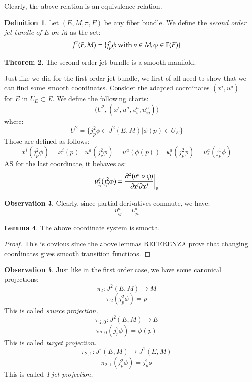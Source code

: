 \documentclass[12pt,a4paper]{report}
\theoremstyle{definition}
\newtheorem{Def}{Definition}[chapter]
\theoremstyle{Theorem}
\newtheorem{Theo}[Def]{Theorem}
\newtheorem{Lm}[Def]{Lemma}
\theoremstyle{break}
\theoremstyle{definition}
\newtheorem{Obs}[Def]{Observation}
\begin{document}
	Clearly, the above relation is an equivalence relation.
	\begin{Def}
		Let $(E,M,\pi,F)$ be any fiber bundle. We define the \textit{second order jet bundle of $E$ on $M$} as the set:
		$$J^2(E,M)=\{j^2_p\phi \hbox{ with }p\in M, \phi\in\Gamma(E)\}$$
	\end{Def}
	\begin{Theo}
		The second order jet bundle is a smooth manifold.
	\end{Theo}
	Just like we did for the first order jet bundle, we first of all need to show that we can find some smooth coordinates. Consider the adapted coordinates $(x^i,u^a)$ for $E$ in $U_E\subset E$. We define the following charts:
	$$\bigg(U^2,(x^i,u^a,u^a_i,u^a_{ij})\bigg)$$
	where: 
	$$U^2=\{j^2_p\phi\in J^2(E,M)\big|\phi(p)\in U_E\}$$
	Those are defined as follows:
	$$x^i(j^2_p\phi)=x^i(p)\hspace{10pt} u^a(j^2_p\phi)=u^a(\phi(p))\hspace{10pt}
	u^a_i(j^2_p\phi)=u^a_i(j^1_p\phi)$$
	AS for the last coordinate, it behaves as:
	$$u^a_{ij}(j^2_p\phi)={\partial^2 (u^a\circ \phi)\over \partial x^i \partial x^j}\bigg|_p$$
	\begin{Obs}
		Clearly, since partial derivatives commute, we have:
		$$u^a_{ij}=u^a_{ji}$$
	\end{Obs}
	\begin{Lm}
		The above coordinate system is smooth.
	\end{Lm}
	\begin{proof}
		This is obvious since the above lemmas REFERENZA prove that changing coordinates gives smooth transition functions.
	\end{proof}
	\begin{Obs}
		Just like in the first order case, we have some canonical projections:
		$$\pi_2:J^2(E,M)\longrightarrow M$$
		$$\pi_2(j^2_p\phi)=p$$
		This is called \textit{source projection.}
		$$\pi_{2,0}:J^2(E,M)\longrightarrow E$$
		$$\pi_{2,0}(j^2_p\phi)=\phi(p)$$
		This is called \textit{target projection.}
		$$\pi_{2,1}:J^2(E,M)\longrightarrow J^1(E,M)$$
		$$\pi_{2,1}(j^2_p\phi)=j^1_p\phi$$
		This is called \textit{1-jet projection.}
	\end{Obs}
	\begin{center}
	\end{center}
\end{document}

